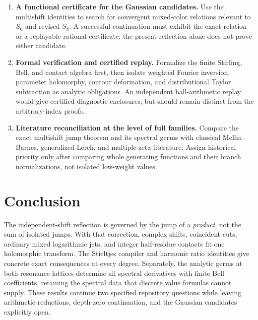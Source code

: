 \documentclass[11pt,letterpaper]{article}
\theoremstyle{definition}\newtheorem{definition}[theorem]{Definition}
\theoremstyle{remark}\newtheorem{remark}[theorem]{Remark}
\begin{document}
\begin{enumerate}[label=Q\arabic*.]
\item \textbf{A functional certificate for the Gaussian candidates.}
Use the multishift identities to search for convergent mixed-color
relations relevant to $S_6$ and revised $S_8$. A successful continuation
must exhibit the exact relation or a replayable rational certificate;
the present reflection alone does not prove either candidate.

\item \textbf{Formal verification and certified replay.}
Formalize the finite Stirling, Bell, and contact algebra first, then isolate
weighted Fourier inversion, parameter holomorphy, contour deformation,
and distributional Taylor subtraction as analytic obligations.
An independent ball-arithmetic replay would give certified diagnostic
enclosures, but should remain distinct from the arbitrary-index proofs.

\item \textbf{Literature reconciliation at the level of full families.}
Compare the exact multishift jump theorem and its spectral germs with
classical Mellin--Barnes, generalized-Lerch, and multiple-zeta literature.
Assign historical priority only after comparing whole generating
functions and their branch normalizations, not isolated low-weight values.
\end{enumerate}

\section*{Conclusion}
The independent-shift reflection is governed by the jump of a
\emph{product}, not the sum of isolated jumps. With that correction,
complex shifts, coincident cuts, ordinary mixed logarithmic jets,
and integer half-residue contacts fit one holomorphic transform.
The Stieltjes compiler and harmonic ratio identities give concrete
exact consequences at every degree. Separately, the analytic germs
at both resonance lattices determine all spectral derivatives with
finite Bell coefficients, retaining the spectral data that discrete
value formulas cannot supply. These results continue two specified
repository questions while leaving arithmetic reductions, depth-zero
continuation, and the Gaussian candidates explicitly open.

\appendix
\end{document}
